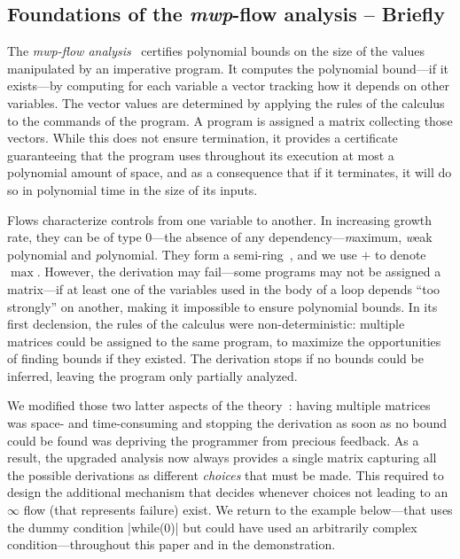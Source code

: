 {{    \subsection{Foundations of the \emph{mwp}-flow analysis -- Briefly}
    \label{sec:mwp}

    The \emph{mwp-flow analysis}~\cite{Jones2009} certifies polynomial bounds on the size of the values manipulated by
    an imperative program. It computes the polynomial bound---if it exists---by computing for each variable a vector tracking how it depends on other variables.
    The vector values are determined by applying the rules of the
    calculus to the commands of the program. A program is assigned a matrix collecting those vectors. While this does
    not ensure termination, it provides a certificate guaranteeing that the program uses throughout its execution at
    most a polynomial amount of space, and as a consequence that if it terminates, it will do so in polynomial time in the size of its inputs.

    Flows characterize controls from one variable to another. In increasing growth rate, they can be of type 0---the
    absence of any dependency---\emph{m}aximum, \emph{w}eak polynomial and \emph{p}olynomial.
    They form a semi-ring~\cite[A.1 and A.2]{Aubert2022i}, and we use $+$ to denote $\max$.
     However, the derivation
    may fail---some programs may not be assigned a matrix---if at least one of the variables used in the body of a loop
    depends \enquote{too strongly} on another, making it impossible to ensure polynomial bounds. 
    In its first declension, the rules of the calculus were non-deterministic: multiple matrices could be assigned to the same program,
    to maximize the opportunities of finding bounds if they existed.
    The derivation stops if no bounds could be inferred, leaving the program only partially analyzed.


	We modified those two latter aspects of the theory~\cite{Aubert2022b}:
    having multiple matrices was space- and time-consuming and
	stopping the derivation as soon as no bound could be found was depriving the programmer from precious feedback.
	As a result, the upgraded analysis now always provides a single matrix capturing all the possible derivations as different \emph{choices} that must be made.
	This required to design the additional mechanism that decides whenever choices not leading to an $\infty$ flow (that represents failure) exist.
	We return to the example below---that uses the dummy condition \prc|while(0)| but could have used an arbitrarily complex condition---throughout this paper and in the demonstration.
	

}}
